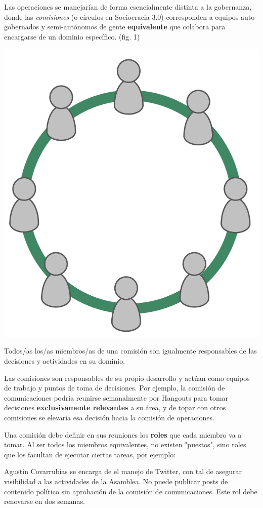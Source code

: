 \documentclass[justified]{tufte-handout} %
\begin{document}
Las operaciones se manejarían de forma esencialmente distinta a la gobernanza, donde las \textit{comisiones} (o círculos en Sociocracia 3.0) corresponden a equipos auto-gobernados y semi-autónomos de gente \textbf{equivalente} que colabora para encargarse de un dominio específico. (fig. 1)
\begin{marginfigure}[-10px]
	\includegraphics[width=\linewidth]{circulo.png}
	\caption{Todos/as los/as miembros/as de una comisión son igualmente responsables de las decisiones y actividades en su dominio.}
	\label{fig:circulo}
\end{marginfigure}

Las comisiones son responsables de su propio desarrollo y actúan como equipos de trabajo y puntos de toma de decisiones. Por ejemplo, la comisión de comunicaciones podría reunirse semanalmente por Hangouts para tomar decisiones \textbf{exclusivamente relevantes} a su área, y de topar con otros comisiones se elevaría esa decisión hacia la comisión de operaciones.

Una comisión debe definir en sus reuniones los \textbf{roles} que cada miembro va a tomar. Al ser todos los miembros equivalentes, no existen "puestos", sino roles que los facultan de ejecutar ciertas tareas, por ejemplo:
\begin{displayquote}
	Agustín Covarrubias se encarga de el manejo de Twitter, con tal de asegurar visibilidad a las actividades de la Asamblea. No puede publicar posts de contenido político sin aprobación de la comisión de comunicaciones. Este rol debe renovarse en dos semanas.
\end{displayquote}
\end{document}
